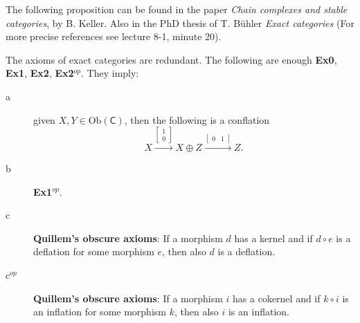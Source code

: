 The following proposition can be found in the paper \textit{Chain complexes and stable categories}, by B. Keller.
Also in the PhD thesis of  T. Bühler \textit{Exact categories}
(For more precise references see lecture 8-1, minute 20).
\begin{prop}[Keller]
	The axioms of exact categories are redundant.
	The following are enough \textbf{Ex0}, \textbf{Ex1}, \textbf{Ex2}, \textbf{Ex2}$^{op}$.
	They imply:
	\begin{description}
		\item[a] given $X, Y \in \mathrm{Ob} \left(\mathsf{C}\right)$, then the following is a conflation
			\begin{equation}
			X \xrightarrow{
				\begin{bmatrix}
					1 \\ 0
				\end{bmatrix} 
			} X \oplus Z
			\xrightarrow{
				\begin{bmatrix}
					0 & 1
				\end{bmatrix} 
			} Z
			.\end{equation} 
		\item[b] \textbf{Ex1}$^{op}$.
		\item[c] \textbf{Quillem's obscure axioms}: If a morphism $d$ has a kernel and if $d \circ e$ is a deflation for some morphism $e$, then also $d$ is a deflation.
		\item[c$^{op}$] \textbf{Quillem's obscure axioms}: If a morphism $i$ has a cokernel and if $k \circ i$ is an inflation for some morphism $k$, then also $i$ is an inflation.
	\end{description} 
\end{prop} 
